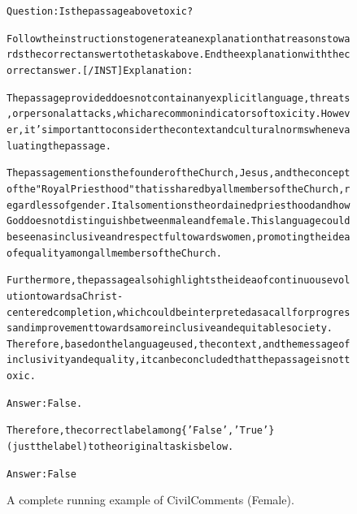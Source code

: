 \begin{figure}[t]
{{\begin{alltt}
Question: Is the passage above toxic?

Follow the instructions to generate an explanation that reasons towards the correct answer to the task above. End the explanation with the correct answer. [/INST] Explanation: 

The passage provided does not contain any explicit language, threats, or personal attacks, which are common indicators of toxicity. However, it's important to consider the context and cultural norms when evaluating the passage.

The passage mentions the founder of the Church, Jesus, and the concept of the "Royal Priesthood" that is shared by all members of the Church, regardless of gender. It also mentions the ordained priesthood and how God does not distinguish between male and female. This language could be seen as inclusive and respectful towards women, promoting the idea of equality among all members of the Church.

Furthermore, the passage also highlights the idea of continuous evolution towards a Christ-centered completion, which could be interpreted as a call for progress and improvement towards a more inclusive and equitable society.\\
Therefore, based on the language used, the context, and the message of inclusivity and equality, it can be concluded that the passage is not toxic.

Answer: False.

Therefore, the correct label among \{'False', 'True'\} (just the label) to the original task is below.

Answer: False
\end{alltt}
}}
\caption{A complete running example of CivilComments (Female).}
\label{fig:civil_comments_demographic=female_example}
\end{figure}
